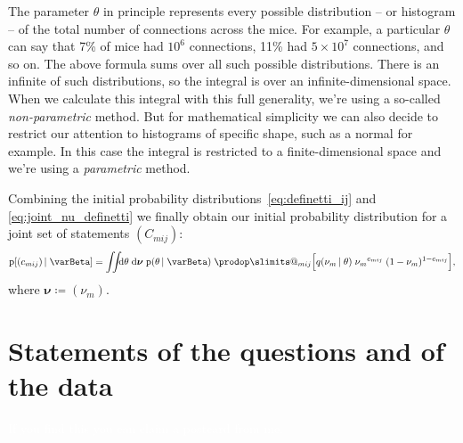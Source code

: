 \documentclass[\ifafour a4paper,12pt,\else a5paper,10pt,\fi%
onecolumn,oneside,article,%
british%
]{memoir}
\makeatletter
\theoremstyle{remark}
\theoremstyle{innote}
\def\prod{\DOTSI\prodop\slimits@}
\newcommand*{\di}{\mathrm{d}}%
\newcommand*{\defd}{\coloneqq}
\newcommand*{\pf}{\mathrm{p}}%
\renewcommand*{\|}[1][]{\nonscript\,#1\vert\nonscript\;\mathopen{}}
\newcommand*{\yI}{\varBeta}
\newcommand*{\yC}{C}
\newcommand*{\yc}{c}
\newcommand*{\yq}{q}
\newcommand*{\yth}{\theta}
\newcommand*{\ynu}{\bm{\nu}}
\makeatother
\begin{document}
The parameter $\yth$ in principle represents every possible distribution --
or histogram -- of the total number of connections across the mice. For
example, a particular $\yth$ can say that 7\% of mice had $10^6$
connections, 11\% had $5\times 10^{7}$ connections, and so on. The above
formula sums over all such possible distributions. There is an infinite of
such distributions, so the integral is over an infinite-dimensional space.
When we calculate this integral with this full generality, we're using a
so-called \emph{non-parametric} method. But for mathematical simplicity we
can also decide to restrict our attention to histograms of specific shape,
such as a normal for example. In this case the integral is restricted to a
finite-dimensional space and we're using a \emph{parametric} method.

\medskip

Combining the initial probability distributions~\eqref{eq:definetti_ij} and
\eqref{eq:joint_nu_definetti} we finally obtain our initial probability
distribution for a joint set of statements $(\yC_{mij})$:
\begin{equation}
  \label{eq:main_init_prob_simplified}
    \pf[(\yc_{mij}) \| \yI] =
    \iint\!\!\!\di\yth\;\di\ynu\;
    \pf(\yth \| \yI)\;
    \prod_{mij}\Bigl[ \yq(\nu_{m} \| \yth)\;
  {\nu_{m}}^{\yc_{mij}}\;(1-\nu_{m})^{1-\yc_{mij}}
  \Bigr],
\end{equation}
where $\ynu \defd (\nu_{m})$.



\section{Statements of the questions and of the data}
\label{sec:statements_question_data}














\textcolor{white}{If you find this you can claim a postcard from me.}
\end{document}
